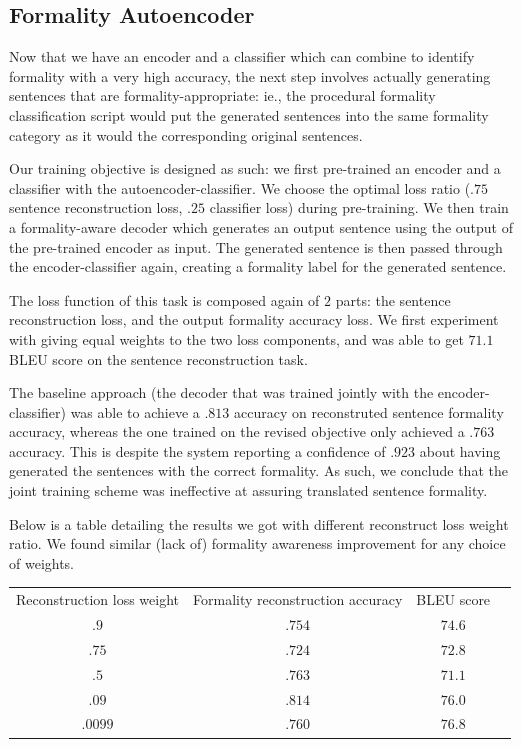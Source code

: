 \documentclass[11pt]{article}
\begin{document}
\subsection{Formality Autoencoder}

Now that we have an encoder and a classifier which can combine to identify formality with a very high accuracy, the next step involves actually generating sentences that are formality-appropriate: ie., the procedural formality classification script would put the generated sentences into the same formality category as it would the corresponding original sentences.

Our training objective is designed as such: we first pre-trained an encoder and a classifier with the autoencoder-classifier. We choose the optimal loss ratio ($.75$ sentence reconstruction loss, $.25$ classifier loss) during pre-training. We then train a formality-aware decoder which generates an output sentence using the output of the pre-trained encoder as input. The generated sentence is then passed through the encoder-classifier again, creating a formality label for the generated sentence.

The loss function of this task is composed again of $2$ parts: the sentence reconstruction loss, and the output formality accuracy loss. We first experiment with giving equal weights to the two loss components, and was able to get $71.1$ BLEU score on the sentence reconstruction task.

The baseline approach (the decoder that was trained jointly with the encoder-classifier) was able to achieve a $.813$ accuracy on reconstruted sentence formality accuracy, whereas the one trained on the revised objective only achieved a $.763$ accuracy. This is despite the system reporting a confidence of $.923$ about having generated the sentences with the correct formality. As such, we conclude that the joint training scheme was ineffective at assuring translated sentence formality.  

Below is a table detailing the results we got with different reconstruct loss weight ratio. We found similar (lack of) formality awareness improvement for any choice of weights. 

\begin{tabular}{ c c c c }
    Reconstruction loss weight & Formality reconstruction accuracy & BLEU score \\
    $.9$ & $.754$ & $74.6$ \\
    $.75$ & $.724$ & $72.8$ \\
    $.5$ & $.763$ & $71.1$ \\
    $.09$ & $.814$ & $76.0$ \\
    $.0099$ & $.760$ & $76.8$ \\
\end{tabular}
\end{document}
